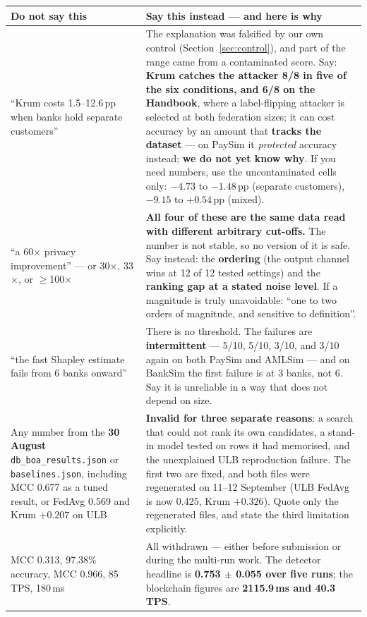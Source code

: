 \documentclass[11pt]{article}
\newcommand{\x}{\ensuremath{\times}}
\begin{document}
\begin{center}\small
\renewcommand{\arraystretch}{1.2}
\begin{tabularx}{\linewidth}{@{}p{5.6cm} X@{}}
\toprule
\textbf{Do not say this} & \textbf{Say this instead --- and here is why} \\
\midrule
``Krum costs 1.5--12.6\,pp when banks hold separate customers'' & The explanation was falsified by our own control (Section~\ref{sec:control}), and part of the range came from a contaminated score. Say: \textbf{Krum catches the attacker 8/8 in five of the six conditions, and 6/8 on the Handbook}, where a label-flipping attacker is selected at both federation sizes; it can cost accuracy by an amount that \textbf{tracks the dataset} --- on PaySim it \emph{protected} accuracy instead; \textbf{we do not yet know why}. If you need numbers, use the uncontaminated cells only: $-4.73$ to $-1.48$\,pp (separate customers), $-9.15$ to $+0.54$\,pp (mixed). \\
``a 60\x{} privacy improvement'' --- or 30\x, 33\x, or $\ge$100\x & \textbf{All four of these are the same data read with different arbitrary cut-offs.} The number is not stable, so no version of it is safe. Say instead: the \textbf{ordering} (the output channel wins at 12 of 12 tested settings) and the \textbf{ranking gap at a stated noise level}. If a magnitude is truly unavoidable: ``one to two orders of magnitude, and sensitive to definition''. \\
``the fast Shapley estimate fails from 6 banks onward'' & There is no threshold. The failures are \textbf{intermittent} --- 5/10, 5/10, 3/10, and 3/10 again on both PaySim and AMLSim --- and on BankSim the first failure is at 3 banks, not 6. Say it is unreliable in a way that does not depend on size. \\
Any number from the \textbf{30 August} \texttt{db\_boa\_results.json} or \texttt{baselines.json}, including MCC 0.677 as a tuned result, or FedAvg 0.569 and Krum $+0.207$ on ULB & \textbf{Invalid for three separate reasons}: a search that could not rank its own candidates, a stand-in model tested on rows it had memorised, and the unexplained ULB reproduction failure. The first two are fixed, and both files were regenerated on 11--12 September (ULB FedAvg is now 0.425, Krum $+0.326$). Quote only the regenerated files, and state the third limitation explicitly. \\
MCC 0.313, 97.38\% accuracy, MCC 0.966, 85\,TPS, 180\,ms & All withdrawn --- either before submission or during the multi-run work. The detector headline is \textbf{0.753 $\pm$ 0.055 over five runs}; the blockchain figures are \textbf{2115.9\,ms and 40.3\,TPS}. \\

\end{tabularx}
\end{center}
\end{document}
